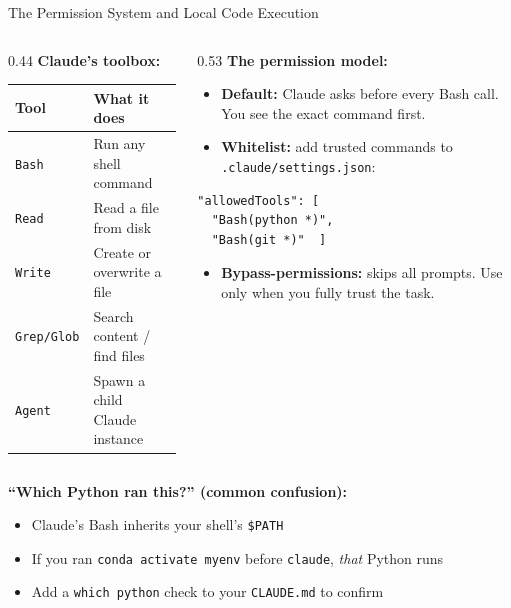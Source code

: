 \documentclass[10pt,english,aspectratio=169]{beamer}
\begin{document}
\begin{frame}[fragile]{The Permission System and Local Code Execution}

\begin{columns}[T]
\begin{column}{0.44\textwidth}
\textbf{Claude's toolbox:}

\vspace{0.15cm}
\footnotesize
\begin{tabular}{|l|p{2.8cm}|}
\hline
\textbf{Tool} & \textbf{What it does} \\ \hline
\texttt{Bash} & Run any shell command \\ \hline
\texttt{Read} & Read a file from disk \\ \hline
\texttt{Write} & Create or overwrite a file \\ \hline
\texttt{Grep/Glob} & Search content / find files \\ \hline
\texttt{Agent} & Spawn a child Claude instance \\ \hline
\end{tabular}
\end{column}
\begin{column}{0.53\textwidth}
\textbf{The permission model:}

\vspace{0.1cm}
\footnotesize
\begin{itemize}
    \item \textbf{Default:} Claude asks before every Bash call. You see the exact command first.
    \item \textbf{Whitelist:} add trusted commands to \texttt{.claude/settings.json}:
\end{itemize}
\begin{lstlisting}[style=pythonstyle,language={},basicstyle=\ttfamily\tiny,numbers=none]
"allowedTools": [
  "Bash(python *)",
  "Bash(git *)"  ]
\end{lstlisting}
\begin{itemize}
    \item \textbf{Bypass-permissions:} skips all prompts. Use only when you fully trust the task.
\end{itemize}
\end{column}
\end{columns}

\vspace{0.2cm}

\textbf{``Which Python ran this?'' (common confusion):}
\begin{itemize}
    \item Claude's Bash inherits your shell's \texttt{\$PATH}
    \item If you ran \texttt{conda activate myenv} before \texttt{claude}, \textit{that} Python runs
    \item Add a \texttt{which python} check to your \texttt{CLAUDE.md} to confirm
\end{itemize}
\end{frame}
\end{document}
